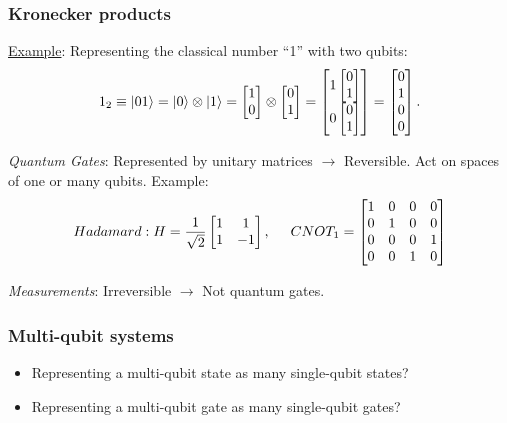 \documentclass{beamer}
\theoremstyle{definition}
\begin{document}
\begin{frame}
\frametitle{Kronecker products}
\underline{Example}: Representing the classical number ``1'' with two qubits:
\begin{align*}
1_2 \equiv \left\vert{01}\right\rangle = \left\vert{0}\right\rangle \otimes \left\vert{1}\right\rangle = \begin{bmatrix}
1\\0
\end{bmatrix}\otimes 
\begin{bmatrix}
0\\1
\end{bmatrix}
=
\begin{bmatrix}
1\begin{bmatrix}
0\\1
\end{bmatrix}\\
0\begin{bmatrix}
0\\1
\end{bmatrix}
\end{bmatrix} = \begin{bmatrix}
0\\1\\0\\0
\end{bmatrix}.
\end{align*}
\end{frame}



\begin{frame}
\textit{Quantum Gates}: Represented by unitary matrices $\rightarrow$ Reversible. Act on spaces of one or many qubits. Example: 
\begin{align*}
Hadamard: H = \frac{1}{\sqrt{2}}\begin{bmatrix}
1&1\\1&-1
\end{bmatrix}, \hspace{0.5cm}
CNOT_1 = \begin{bmatrix}
1&0&0&0\\
0&1&0&0\\
0&0&0&1\\
0&0&1&0
\end{bmatrix}
\end{align*}

\textit{Measurements}: Irreversible $\rightarrow$ Not quantum gates.
\end{frame}


\begin{frame}
\frametitle{Multi-qubit systems}

\begin{itemize}

\item Representing a multi-qubit state as many single-qubit states?
\item Representing a multi-qubit gate as many single-qubit gates?
\end{itemize}
\end{frame}
\end{document}
